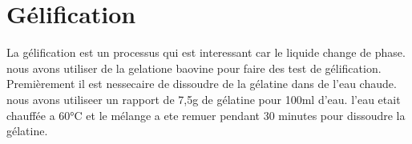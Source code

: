 \section{Gélification}
La gélification est un processus qui est interessant car le liquide change de phase.
nous avons utiliser de la gelatione baovine pour faire des test de gélification.
Premièrement il est nessecaire de dissoudre de la gélatine dans de l'eau chaude. nous avons utiliseer un rapport de 7,5g de gélatine pour 100ml d'eau. l'eau etait chauffée a 60°C et le mélange a ete remuer pendant 30 minutes pour dissoudre la gélatine.



